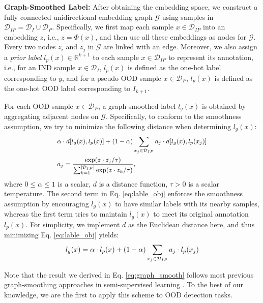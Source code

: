 \documentclass[11pt]{article}
\begin{document}
\noindent\textbf{Graph-Smoothed Label:}
After obtaining the embedding space, we construct a fully connected unidirectional embedding graph $\mathcal{G}$ using samples in $\mathcal{D}_{IP} = \mathcal{D}_I \cup \mathcal{D}_P$. Specifically, we first map each sample $x \in \mathcal{D}_{IP}$ into an embedding $z$, i.e., $z = \Phi(x)$, and then use all these embeddings as nodes for $\mathcal{G}$. Every two nodes $z_i$ and $z_j$ in $\mathcal{G}$ are linked with an edge. Moreover, we also assign a \emph{prior label} $l_p(x) \in \mathbb{R}^{k+1}$ to each sample $x \in \mathcal{D}_{IP}$ to represent its annotation, i.e., for an IND sample $x \in \mathcal{D}_I$, $l_p(x)$ is defined as the one-hot label corresponding to $y$, and for a pseudo OOD sample $x \in \mathcal{D}_P$, $l_p(x)$ is defined as the one-hot OOD label corresponding to $I_{k+1}$.

For each OOD sample $x \in \mathcal{D}_P$, a graph-smoothed label $l_g(x)$ is obtained by aggregating adjacent nodes on $\mathcal{G}$. Specifically, to conform to the smoothness assumption, we try to minimize the following distance when determining $l_g(x)$:
\begin{equation}
\small
\begin{split}
& \alpha \cdot d[l_g(x), l_p(x)] + (1-\alpha) \sum_{x_j \in \mathcal{D}_{IP}} a_{j} \cdot d[ l_g(x), l_p(x_j) ] \label{eq:lable_obj} \\
& a_{j} = \frac{{\rm exp}(z \cdot z_j / \tau)}{\sum_{k=1}^{|\mathcal{D}_{IP}|} {\rm exp}(z \cdot z_k / \tau)},
\end{split}
\end{equation}
where $0 \leq \alpha \leq 1$ is a scalar, $d$ is a distance function, $\tau > 0$ is a scalar temperature. The second term in Eq. \ref{eq:lable_obj} enforces the smoothness assumption by encouraging $l_g(x)$ to have similar labels with its nearby samples, whereas the first term tries to maintain $l_g(x)$ to meet its original annotation $l_p(x)$. For simplicity, we implement $d$ as the Euclidean distance here, and thus minimizing Eq. \ref{eq:lable_obj} yields:
\begin{equation}\label{eq:graph_smooth}
\small
l_g(x) = \alpha \cdot l_p(x) + (1-\alpha) \sum_{x_j \in \mathcal{D}_{IP}} a_{j} \cdot l_p(x_j)
\end{equation}

Note that the result we derived in Eq. \ref{eq:graph_smooth} follows most previous graph-smoothing approaches in semi-supervised learning \cite{van2020survey}. To the best of our knowledge, we are the first to apply this scheme to OOD detection tasks.
\end{document}

